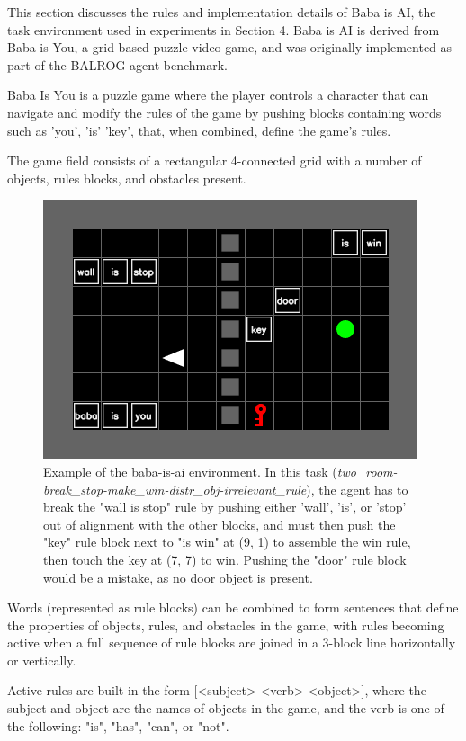 This section discusses the rules and implementation details of Baba is AI, the task
environment used in experiments in Section 4. Baba is AI is derived from Baba is
You, a grid-based puzzle video game, and was originally implemented as part of the
BALROG \cite{paglieri2024balrog} agent benchmark.

Baba Is You is a puzzle game where the player controls a character that can navigate
and modify the rules of the game by pushing blocks containing words such as 'you',
'is' 'key', that, when combined, define the game's rules.

The game field consists of a rectangular 4-connected grid with a number of objects,
rules blocks, and obstacles present.

\begin{figure}[ht]
	\centering
	\includegraphics[scale=0.75]{figs/babaisai_env.png}
	\caption{Example of the baba-is-ai environment. In this task (\textit{two\_room-break\_stop-make\_win-distr\_obj-irrelevant\_rule}),
	the agent has to break the "wall is stop" rule by pushing either 'wall', 'is',
	or 'stop' out of alignment with the other blocks, and must then push the "key"
	rule block next to "is win" at (9, 1) to assemble the win rule, then touch the
	key at (7, 7) to win. Pushing the "door" rule block would be a mistake, as no door
	object is present.}
	\label{fig:babaisai_env}
\end{figure}

Words (represented as rule blocks) can be combined to form sentences that define
the properties of objects, rules, and obstacles in the game, with rules becoming
active when a full sequence of rule blocks are joined in a 3-block line horizontally
or vertically.

Active rules are built in the form [<subject> <verb> <object>], where the
subject and object are the names of objects in the game, and the verb is one of the
following: "is", "has", "can", or "not".

